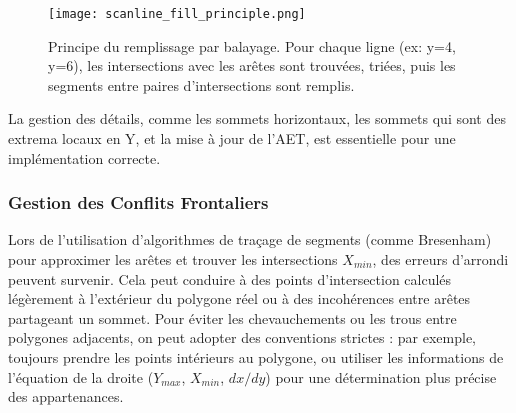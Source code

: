 \documentclass{article}
\begin{document}
\begin{figure}[H]
\centering
\texttt{[image: scanline\_fill\_principle.png]}
\caption{Principe du remplissage par balayage. Pour chaque ligne (ex: y=4, y=6), les intersections avec les arêtes sont trouvées, triées, puis les segments entre paires d'intersections sont remplis.}
\label{fig:scanline_fill_principle}
\end{figure}

La gestion des détails, comme les sommets horizontaux, les sommets qui sont des extrema locaux en Y, et la mise à jour de l'AET, est essentielle pour une implémentation correcte.

\subsubsection{Gestion des Conflits Frontaliers}
Lors de l'utilisation d'algorithmes de traçage de segments (comme Bresenham) pour approximer les arêtes et trouver les intersections $X_{min}$, des erreurs d'arrondi peuvent survenir. Cela peut conduire à des points d'intersection calculés légèrement à l'extérieur du polygone réel ou à des incohérences entre arêtes partageant un sommet. Pour éviter les chevauchements ou les trous entre polygones adjacents, on peut adopter des conventions strictes : par exemple, toujours prendre les points intérieurs au polygone, ou utiliser les informations de l'équation de la droite ($Y_{max}$, $X_{min}$, $dx/dy$) pour une détermination plus précise des appartenances.
\end{document}
